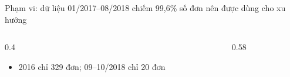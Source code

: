 \begin{frame}{Phạm vi: dữ liệu 01/2017–08/2018 chiếm 99,6\% số đơn nên được dùng cho xu hướng}
\begin{columns}[T]\begin{column}{0.4\textwidth}
\begin{itemize}
  \item 2016 chỉ 329 đơn; 09–10/2018 chỉ 20 đơn
\end{itemize}
\end{column}\begin{column}{0.58\textwidth}
\begin{center}\end{center}
\end{column}\end{columns}

\end{frame}

